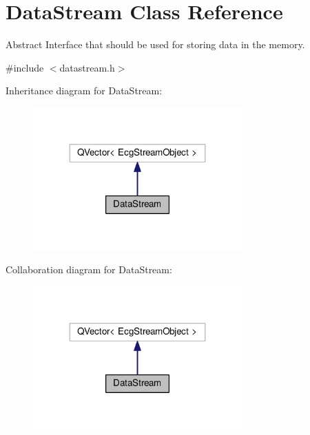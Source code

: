 \hypertarget{classDataStream}{}\section{Data\+Stream Class Reference}
\label{classDataStream}


Abstract Interface that should be used for storing data in the memory.  




{\ttfamily \#include $<$datastream.\+h$>$}



Inheritance diagram for Data\+Stream\+:\nopagebreak
\begin{figure}[H]
\begin{center}
\leavevmode
\includegraphics[width=227pt]{classDataStream__inherit__graph}
\end{center}
\end{figure}


Collaboration diagram for Data\+Stream\+:\nopagebreak
\begin{figure}[H]
\begin{center}
\leavevmode
\includegraphics[width=227pt]{classDataStream__coll__graph}
\end{center}
\end{figure}
